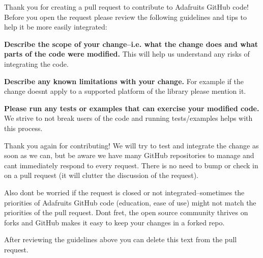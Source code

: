 Thank you for creating a pull request to contribute to Adafruit\textquotesingle{}s Git\+Hub code! Before you open the request please review the following guidelines and tips to help it be more easily integrated\+:


\begin{DoxyItemize}
\item {\bfseries Describe the scope of your change--i.\+e. what the change does and what parts of the code were modified.} This will help us understand any risks of integrating the code.
\item {\bfseries Describe any known limitations with your change.} For example if the change doesn\textquotesingle{}t apply to a supported platform of the library please mention it.
\item {\bfseries Please run any tests or examples that can exercise your modified code.} We strive to not break users of the code and running tests/examples helps with this process.
\end{DoxyItemize}

Thank you again for contributing! We will try to test and integrate the change as soon as we can, but be aware we have many Git\+Hub repositories to manage and can\textquotesingle{}t immediately respond to every request. There is no need to bump or check in on a pull request (it will clutter the discussion of the request).

Also don\textquotesingle{}t be worried if the request is closed or not integrated--sometimes the priorities of Adafruit\textquotesingle{}s Git\+Hub code (education, ease of use) might not match the priorities of the pull request. Don\textquotesingle{}t fret, the open source community thrives on forks and Git\+Hub makes it easy to keep your changes in a forked repo.

After reviewing the guidelines above you can delete this text from the pull request. 